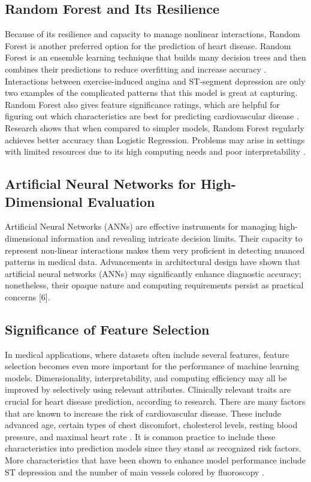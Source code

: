 \subsection{Random Forest and Its Resilience}
Because of its resilience and capacity to manage nonlinear interactions, Random Forest is another preferred option for the prediction of heart disease. Random Forest is an ensemble learning technique that builds many decision trees and then combines their predictions to reduce overfitting and increase accuracy \cite{ren2017forest}. Interactions between exercise-induced angina and ST-segment depression are only two examples of the complicated patterns that this model is great at capturing. Random Forest also gives feature significance ratings, which are helpful for figuring out which characteristics are best for predicting cardiovascular disease \cite{zhou2021machine}. Research shows that when compared to simpler models, Random Forest regularly achieves better accuracy than Logistic Regression. Problems may arise in settings with limited resources due to its high computing needs and poor interpretability \cite{soman2009machine}.

\subsection{Artificial Neural Networks for High-Dimensional Evaluation}
Artificial Neural Networks (ANNs) are effective instruments for managing high-dimensional information and revealing intricate decision limits. Their capacity to represent non-linear interactions makes them very proficient in detecting nuanced patterns in medical data. Advancements in architectural design have shown that artificial neural networks (ANNs) may significantly enhance diagnostic accuracy; nonetheless, their opaque nature and computing requirements persist as practical concerns [6].

\subsection{Significance of Feature Selection}
In medical applications, where datasets often include several features, feature selection becomes even more important for the performance of machine learning models. Dimensionality, interpretability, and computing efficiency may all be improved by selectively using relevant attributes. Clinically relevant traits are crucial for heart disease prediction, according to research. There are many factors that are known to increase the risk of cardiovascular disease. These include advanced age, certain types of chest discomfort, cholesterol levels, resting blood pressure, and maximal heart rate \cite{battineni2020diagnosis}. It is common practice to include these characteristics into prediction models since they stand as recognized risk factors. More characteristics that have been shown to enhance model performance include ST depression and the number of main vessels colored by fluoroscopy \cite{soman2009machine}.
